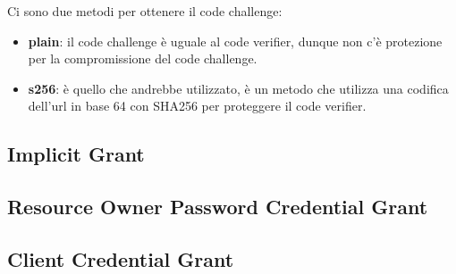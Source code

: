 Ci sono due metodi per ottenere il code challenge:

\begin{itemize}
    \item \textbf{plain}: il code challenge è uguale al code verifier, dunque non c'è
          protezione per la compromissione del code challenge.
    \item \textbf{s256}: è quello che andrebbe utilizzato, è un metodo che utilizza
          una codifica dell'url in base 64 con SHA256 per proteggere il code verifier.
\end{itemize}

\subsection{Implicit Grant}
\subsection{Resource Owner Password Credential Grant}
\subsection{Client Credential Grant}